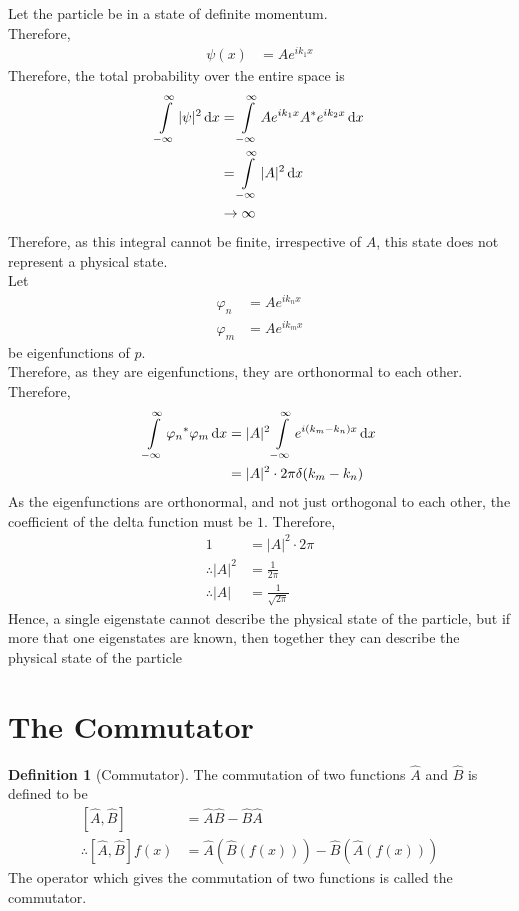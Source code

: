 \documentclass[titlepage, fleqn, a4paper, 12pt, twoside]{article}
\theoremstyle{definition}
\newtheorem{definition}{Definition}
\theoremstyle{theorem}
\let\Oldsection\section
\renewcommand{\section}{\FloatBarrier\Oldsection}
\begin{document}
Let the particle be in a state of definite momentum.\\
Therefore,
\begin{align*}
	\psi(x) &= A e^{i k_1 x}
\end{align*}
Therefore, the total probability over the entire space is
\begin{align*}
	\int\limits_{-\infty}^{\infty} |\psi|^2 \dif x &= \int\limits_{-\infty}^{\infty} A e^{i k_1 x} A^* e^{i k_2 x} \dif x\\
	&= \int\limits_{-\infty}^{\infty} |A|^2 \dif x\\
	&\to \infty
\end{align*}
Therefore, as this integral cannot be finite, irrespective of $A$, this state does not represent a physical state.\\
Let
\begin{align*}
	\varphi_n &= A e^{i k_n x}\\
	\varphi_m &= A e^{i k_m x}
\end{align*}
be eigenfunctions of $\hat{p}$.\\
Therefore, as they are eigenfunctions, they are orthonormal to each other.\\
Therefore,
\begin{align*}
	\int\limits_{-\infty}^{\infty} {\varphi_n}^* \varphi_m \dif x &= |A|^2 \int\limits_{-\infty}^{\infty} e^{i (k_m - k_n) x} \dif x\\
	&= |A|^2 \cdot 2 \pi \delta(k_m - k_n)
\end{align*}
As the eigenfunctions are orthonormal, and not just orthogonal to each other, the coefficient of the delta function must be $1$.
Therefore,
\begin{align*}
	1 &= |A|^2 \cdot 2 \pi\\
	\therefore |A|^2 &= \frac{1}{2 \pi}\\
	\therefore |A| &= \frac{1}{\sqrt{2 \pi}}
\end{align*}
Hence, a single eigenstate cannot describe the physical state of the particle, but if more that one eigenstates are known, then together they can describe the physical state of the particle

\section{The Commutator}

\begin{definition}[Commutator]
	The commutation of two functions $\hat{A}$ and $\hat{B}$ is defined to be
	\begin{align*}
		\left[ \hat{A} , \hat{B} \right] &= \hat{A} \hat{B} - \hat{B} \hat{A}\\
		\therefore \left[ \hat{A} , \hat{B} \right] f(x) &= \hat{A}\left( \hat{B}\left( f(x) \right) \right) - \hat{B}\left( \hat{A}\left( f(x) \right) \right)
	\end{align*}
	The operator which gives the commutation of two functions is called the commutator.
\end{definition}
\end{document}
